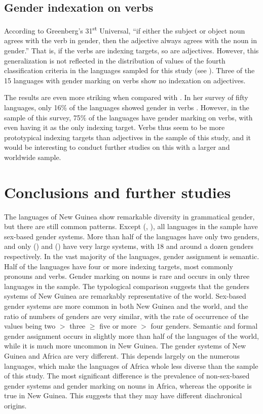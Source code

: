 \documentclass[output=collectionpaper]{langsci/langscibook}
\begin{document}
\subsection{Gender indexation on verbs}


According to Greenberg's 31\textsuperscript{st} Universal, ``if either the subject or object noun agrees with the verb in gender, then the adjective always agrees with the noun in gender.'' That is, if the verbs are indexing targets, so are adjectives. However, this generalization is not reflected in the distribution of values of the fourth classification criteria in the languages sampled for this study (see ). Three of the 15 languages with gender marking on verbs show no indexation on adjectives.



The results are even more striking when compared with \citet{Bybee1985}. In her survey of fifty languages, only 16\% of the languages showed gender in verbs \citep[18]{Bybee1985}. However, in the sample of this survey, 75\% of the languages have gender marking on verbs, with  even having it as the only indexing target. Verbs thus seem to be more prototypical indexing targets than adjectives in the sample of this study, and it would be interesting to conduct further studies on this with a larger and worldwide sample.


\section{Conclusions and further studies}

The languages of New Guinea show remarkable diversity in grammatical gender, but there are still common patterns. Except  (, ), all languages in the sample have sex-based gender systems. More than half of the languages have only two genders, and only  () and  () have very large systems, with 18 and around a dozen genders respectively. In the vast majority of the languages, gender assignment is semantic. Half of the languages have four or more indexing targets, most commonly pronouns and verbs. Gender marking on nouns is rare and occurs in only three languages in the sample. The typological comparison suggests that the genders systems of New Guinea are remarkably representative of the world. Sex-based gender systems are more common in both New Guinea and the world, and the ratio of numbers of genders are very similar, with the rate of occurrence of the values being two $>$ three ${\geq}$ five or more $>$ four genders. Semantic and formal gender assignment occurs in slightly more than half of the languages of the world, while it is much more uncommon in New Guinea. The gender systems of New Guinea and Africa are very different. This depends largely on the numerous  languages, which make the languages of Africa whole less diverse than the sample of this study. The most significant difference is the prevalence of non-sex-based gender systems and gender marking on nouns in Africa, whereas the opposite is true in New Guinea. This suggests that they may have different diachronical origins.
\end{document}
